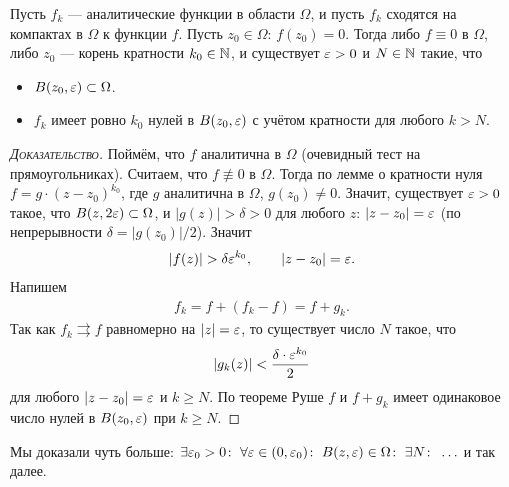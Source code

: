 \documentclass[../complex-analysis.tex]{subfiles}
\begin{document}
 \begin{crly}
  Пусть $ f_k $ --- аналитические функции в области $ \Omega $, и пусть $ f_k $ сходятся на компактах в $ \Omega $ к функции $ f $. Пусть $ z_0 \in \Omega $: $ f(z_0)=0 $. Тогда либо $ f \equiv 0 $ в $ \Omega $, либо $ z_0 $ --- корень кратности $ k_0 \in \mathbb{N} $, и существует $ \varepsilon > 0 $ и $ N \in \mathbb{N} $ такие, что
  \begin{itemize}
   \item $ B(z_0, \varepsilon) \subset \Omega $.
   \item $ f_k $ имеет ровно $ k_0 $ нулей в $ B(z_0, \varepsilon) $ с учётом кратности для любого $ k > N $.
  \end{itemize}
 \end{crly}
 \begin{proof}[\normalfont\textsc{Доказательство}]
  Поймём, что $ f $ аналитична в $ \Omega $ (очевидный тест на прямоугольниках). Считаем, что $ f \not\equiv 0 $ в $ \Omega $. Тогда по лемме о кратности нуля $ f = g\cdot(z - z_0)^{k_0} $, где $ g $ аналитична в $ \Omega $, $ g(z_0) \neq 0 $. Значит, существует $ \varepsilon > 0 $ такое, что $ B(z, 2\varepsilon) \subset \Omega $, и $ \left| g(z) \right| > \delta > 0 $ для любого $ z $: $ \left| z - z_0 \right| = \varepsilon $ (по непрерывности $ \delta = \left| g(z_0) \right| / 2 $). Значит
  \begin{align*}
   \left|f(z) \right| > \delta \varepsilon^{k_0}, \qquad \left| z-z_0 \right|=\varepsilon.
  \end{align*} Напишем
  \begin{align*}
   f_k = f + (f_k - f) = f + g_k.
  \end{align*} Так как $ f_k \rightrightarrows f $ равномерно на $ \left| z \right| = \varepsilon $, то существует число $ N $ такое, что
  \begin{align*}
   \left|g_k(z) \right| < \frac{\delta \cdot \varepsilon^{k_0}}{2}
  \end{align*} для любого $ \left| z-z_0 \right|=\varepsilon $ и $ k \geqslant N $. По теореме Руше $ f $ и $ f + g_k $ имеет одинаковое число нулей в $ B(z_0,\varepsilon) $ при $ k \geqslant N $.
 \end{proof}

 Мы доказали чуть больше: $ \exists \varepsilon_0 > 0 \colon\; \forall \varepsilon \in (0, \varepsilon_0) \colon\; B(z,\varepsilon) \in \Omega \colon\; \exists N \colon\;\ldots  $ и так далее.
\end{document}
